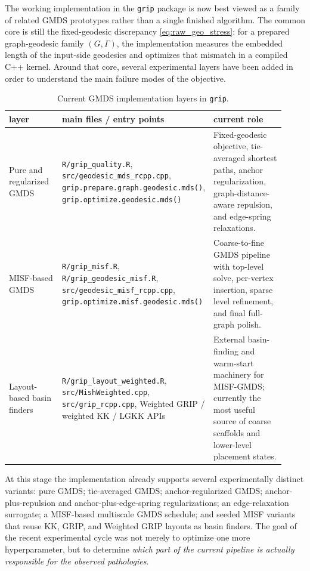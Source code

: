 \documentclass[11pt]{article}
\theoremstyle{definition}
\theoremstyle{plain}
\theoremstyle{remark}
\begin{document}
The working implementation in the \texttt{grip} package is now best viewed as
a family of related GMDS prototypes rather than a single finished algorithm.
The common core is still the fixed-geodesic discrepancy
\cref{eq:raw_geo_stress}: for a prepared graph-geodesic family
$(G,\Gamma)$, the implementation measures the embedded length of the
input-side geodesics and optimizes that mismatch in a compiled C++ kernel.
Around that core, several experimental layers have been added in order to
understand the main failure modes of the objective.

\begin{table}[t]
  \centering
  \small
  \caption{Current GMDS implementation layers in \texttt{grip}.}
  \label{tab:implementation_layers}
  \begin{tabular}{p{0.23\linewidth} p{0.34\linewidth} p{0.35\linewidth}}
    \toprule
    layer & main files / entry points & current role \\
    \midrule
    Pure and regularized GMDS &
    \texttt{R/grip\_quality.R},
    \texttt{src/geodesic\_mds\_rcpp.cpp},
    \texttt{grip.prepare.graph.geodesic.mds()},
    \texttt{grip.optimize.geodesic.mds()} &
    Fixed-geodesic objective, tie-averaged shortest paths, anchor regularization, graph-distance-aware repulsion, and edge-spring relaxations. \\
    \addlinespace
    MISF-based GMDS &
    \texttt{R/grip\_misf.R},
    \texttt{R/grip\_geodesic\_misf.R},
    \texttt{src/geodesic\_misf\_rcpp.cpp},
    \texttt{grip.optimize.misf.geodesic.mds()} &
    Coarse-to-fine GMDS pipeline with top-level solve, per-vertex insertion, sparse level refinement, and final full-graph polish. \\
    \addlinespace
    Layout-based basin finders &
    \texttt{R/grip\_layout\_weighted.R},
    \texttt{src/MishWeighted.cpp},
    \texttt{src/grip\_rcpp.cpp},
    Weighted GRIP / weighted KK / LGKK APIs &
    External basin-finding and warm-start machinery for MISF-GMDS; currently the most useful source of coarse scaffolds and lower-level placement states. \\
    \bottomrule
  \end{tabular}
\end{table}

At this stage the implementation already supports several experimentally
distinct variants: pure GMDS; tie-averaged GMDS; anchor-regularized GMDS;
anchor-plus-repulsion and anchor-plus-edge-spring regularizations; an
edge-relaxation surrogate; a MISF-based multiscale GMDS schedule; and seeded
MISF variants that reuse KK, GRIP, and Weighted GRIP layouts as basin
finders.  The goal of the recent experimental cycle was not merely to optimize
one more hyperparameter, but to determine \emph{which part of the current
pipeline is actually responsible for the observed pathologies}.
\end{document}
